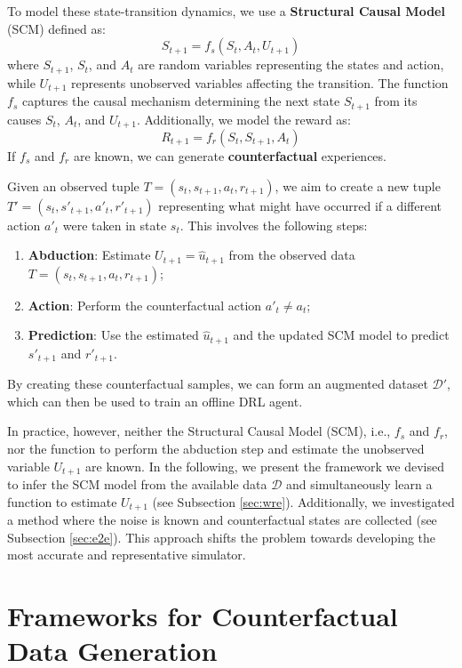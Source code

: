To model these state-transition dynamics, we use a
\textbf{Structural Causal Model} (SCM)
defined as:
\[
S_{t+1} = f_s(S_t, A_t, U_{t+1})
\]
where \( S_{t+1} \), \( S_t \), and \( A_t \) are random variables representing
the states and action, while \( U_{t+1} \) represents unobserved
variables affecting the transition.
The function \( f_s \) captures the causal mechanism
determining the next state \( S_{t+1} \) from its causes
\( S_t \), \( A_t \), and \( U_{t+1} \).
Additionally, we model the reward as:
\[
R_{t+1} = f_r(S_t, S_{t+1}, A_t)
\]
If \( f_s \) and \( f_r \) are known, we can generate
\textbf{counterfactual} experiences.

Given an observed tuple \( T = (s_t, s_{t+1}, a_t, r_{t+1}) \),
we aim to create a new tuple \( T' = (s_t, s'_{t+1}, a'_t, r'_{t+1}) \)
representing what might have occurred if a different action \( a'_t \)
were taken in state \( s_t \). This involves the following steps:
\begin{enumerate}
    \item \textbf{Abduction}: Estimate \( U_{t+1} = \hat{u}_{t+1} \)
    from the observed data \( T = (s_t, s_{t+1}, a_t, r_{t+1}) \);
    \item \textbf{Action}: Perform the counterfactual action
    \( a'_t \neq a_t \);
    \item \textbf{Prediction}: Use the estimated \( \hat{u}_{t+1} \)
    and the updated SCM model to predict \( s'_{t+1} \) and \( r'_{t+1} \).
\end{enumerate}

By creating these counterfactual samples, we can form an augmented dataset
\( \mathcal{D}' \), which can then be used to train an offline DRL agent.

In practice, however, neither the Structural Causal Model (SCM),
i.e., \( f_s \) and \( f_r \), nor the function to perform
the abduction step and estimate the unobserved variable
\( U_{t+1} \) are known. In the following, we present the framework
we devised to infer the SCM model from the available data \( \mathcal{D} \)
and simultaneously learn a function to estimate
\( U_{t+1} \) (see Subsection \ref{sec:wre}). Additionally, we investigated
a method where the noise is known and counterfactual states are collected
(see Subsection \ref{sec:e2e}).
This approach shifts the problem towards developing the most accurate and
representative simulator.

\section{Frameworks for Counterfactual Data Generation}

